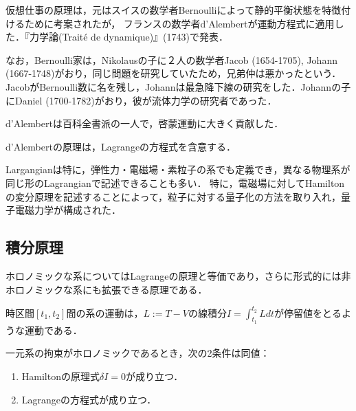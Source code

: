 \documentclass[uplatex,dvipdfmx]{jsreport}
\begin{document}
\begin{axiom}

\end{axiom}
\begin{remark}
    仮想仕事の原理は，元はスイスの数学者Bernoulliによって静的平衡状態を特徴付けるために考案されたが，
    フランスの数学者d'Alembertが運動方程式に適用した．『力学論(Traité de dynamique)』(1743)で発表．

    なお，Bernoulli家は，Nikolausの子に２人の数学者Jacob (1654-1705), Johann (1667-1748)がおり，同じ問題を研究していたため，兄弟仲は悪かったという．
    JacobがBernoulli数に名を残し，Johannは最急降下線の研究をした．Johannの子にDaniel (1700-1782)がおり，彼が流体力学の研究者であった．

    d'Alembertは百科全書派の一人で，啓蒙運動に大きく貢献した．
\end{remark}

\begin{theorem}
    d'Alembertの原理は，Lagrangeの方程式を含意する．
\end{theorem}

\begin{remarks}
    Largangianは特に，弾性力・電磁場・素粒子の系でも定義でき，異なる物理系が同じ形のLagrangianで記述できることも多い．
    特に，電磁場に対してHamiltonの変分原理を記述することによって，粒子に対する量子化の方法を取り入れ，量子電磁力学が構成された．
\end{remarks}

\subsection{積分原理}

\begin{tcolorbox}[colframe=ForestGreen, colback=ForestGreen!10!white,breakable,colbacktitle=ForestGreen!40!white,coltitle=black,fonttitle=\bfseries\sffamily,
title=]
    ホロノミックな系についてはLagrangeの原理と等価であり，さらに形式的には非ホロノミックな系にも拡張できる原理である．
\end{tcolorbox}

\begin{axiom}[Hamiltonの原理]
    時区間$[t_1,t_2]$間の系の運動は，$L:=T-V$の線積分$I=\int^{t_2}_{t_1}Ldt$が停留値をとるような運動である．
\end{axiom}

\begin{theorem}[２つの原理の等価性]
    一元系の拘束がホロノミックであるとき，次の2条件は同値：
    \begin{enumerate}
        \item Hamiltonの原理式$\delta I=0$が成り立つ．
        \item Lagrangeの方程式が成り立つ．
    \end{enumerate}
\end{theorem}
\end{document}
